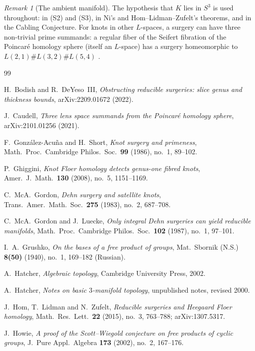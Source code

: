 \documentclass[11pt]{article}
\theoremstyle{definition}
\theoremstyle{remark}
\newtheorem{remark}[theorem]{Remark}
\begin{document}
\begin{remark}[The ambient manifold]
The hypothesis that \(K\) lies in \(S^3\) is used throughout: in (S2) and
(S3), in Ni's and Hom--Lidman--Zufelt's theorems, and in the Cabling
Conjecture. For knots in other \(L\)-spaces, a surgery can have three
non-trivial prime summands: a regular fiber of the Seifert fibration of
the Poincar\'e homology sphere (itself an \(L\)-space) has a surgery
homeomorphic to \(L(2,1)\#L(3,2)\#L(5,4)\) \cite{Caudell2021}.
\end{remark}

\begin{thebibliography}{99}

H.~Bodish and R.~DeYeso~III,
\emph{Obstructing reducible surgeries: slice genus and thickness bounds},
arXiv:2209.01672 (2022).

J.~Caudell,
\emph{Three lens space summands from the Poincar\'e homology sphere},
arXiv:2101.01256 (2021).

F.~Gonz\'alez-Acu\~na and H.~Short,
\emph{Knot surgery and primeness},
Math.\ Proc.\ Cambridge Philos.\ Soc.\ \textbf{99} (1986), no.~1, 89--102.

P.~Ghiggini,
\emph{Knot Floer homology detects genus-one fibred knots},
Amer.\ J.\ Math.\ \textbf{130} (2008), no.~5, 1151--1169.

C.~McA.~Gordon,
\emph{Dehn surgery and satellite knots},
Trans.\ Amer.\ Math.\ Soc.\ \textbf{275} (1983), no.~2, 687--708.

C.~McA.~Gordon and J.~Luecke,
\emph{Only integral Dehn surgeries can yield reducible manifolds},
Math.\ Proc.\ Cambridge Philos.\ Soc.\ \textbf{102} (1987), no.~1, 97--101.

I.~A.~Grushko,
\emph{On the bases of a free product of groups},
Mat.\ Sbornik (N.S.) \textbf{8(50)} (1940), no.~1, 169--182 (Russian).

A.~Hatcher,
\emph{Algebraic topology},
Cambridge University Press, 2002.

A.~Hatcher,
\emph{Notes on basic \(3\)-manifold topology},
unpublished notes, revised 2000.

J.~Hom, T.~Lidman and N.~Zufelt,
\emph{Reducible surgeries and Heegaard Floer homology},
Math.\ Res.\ Lett.\ \textbf{22} (2015), no.~3, 763--788; arXiv:1307.5317.

J.~Howie,
\emph{A proof of the Scott--Wiegold conjecture on free products of
cyclic groups},
J.\ Pure Appl.\ Algebra \textbf{173} (2002), no.~2, 167--176.


\end{thebibliography}
\end{document}
